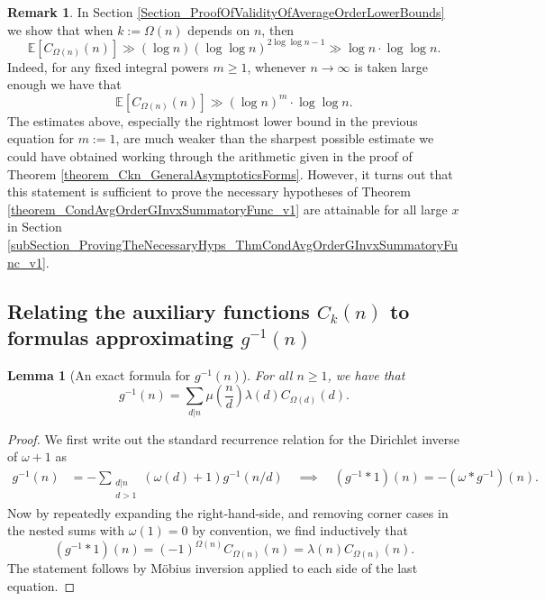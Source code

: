 \documentclass[11pt,reqno,a4letter]{article}
\numberwithin{figure}{section}
\numberwithin{table}{section}
\theoremstyle{plain}
\newtheorem{lemma}[theorem]{Lemma}
\numberwithin{theorem}{section}
\theoremstyle{definition}
\newtheorem{remark}[theorem]{Remark}
\begin{document}
\begin{remark} 
In Section \ref{Section_ProofOfValidityOfAverageOrderLowerBounds} 
we show that when $k := \Omega(n)$ depends on $n$, then 
\[
\mathbb{E}[C_{\Omega(n)}(n)] \gg (\log n) (\log\log n)^{2\log\log n - 1} \gg \log n \cdot \log\log n. 
\] 
Indeed, for any fixed integral powers $m \geq 1$, whenever $n \rightarrow \infty$ is taken large enough 
we have that 
\[
\mathbb{E}[C_{\Omega(n)}(n)] \gg (\log n)^{m} \cdot \log\log n.  
\]
The estimates above, especially the rightmost lower bound in the previous equation for $m := 1$, 
are much weaker than the sharpest possible estimate we could have obtained working through 
the arithmetic given in the proof of 
Theorem \ref{theorem_Ckn_GeneralAsymptoticsForms}. 
However, it turns out that this statement is sufficient to prove the necessary hypotheses of 
Theorem \ref{theorem_CondAvgOrderGInvxSummatoryFunc_v1} 
are attainable for all large $x$ in 
Section \ref{subSection_ProvingTheNecessaryHyps_ThmCondAvgOrderGInvxSummatoryFunc_v1}. 
\end{remark} 

\subsection{Relating the auxiliary functions $C_k(n)$ to formulas approximating $g^{-1}(n)$} 

\begin{lemma}[An exact formula for $g^{-1}(n)$] 
\label{lemma_AnExactFormulaFor_gInvByMobiusInv_v1} 
For all $n \geq 1$, we have that 
\[
g^{-1}(n) = \sum_{d|n} \mu\left(\frac{n}{d}\right) \lambda(d) C_{\Omega(d)}(d). 
\]
\end{lemma}
\begin{proof} 
We first write out the standard recurrence relation for the Dirichlet inverse of 
$\omega+1$ as 
\begin{align*} 
g^{-1}(n) & = - \sum_{\substack{d|n \\ d>1}} (\omega(d) + 1) g^{-1}(n/d) 
     \quad\implies\quad 
     (g^{-1} \ast 1)(n) = -(\omega \ast g^{-1})(n). 
\end{align*} 
Now by repeatedly expanding the right-hand-side, and removing corner cases in the nested sums with 
$\omega(1) = 0$ by convention, we find inductively that 
\[
(g^{-1} \ast 1)(n) = (-1)^{\Omega(n)} C_{\Omega(n)}(n) = \lambda(n) C_{\Omega(n)}(n). 
\]
The statement follows by M\"obius inversion applied to each side of the last equation. 
\end{proof} 
\end{document}
